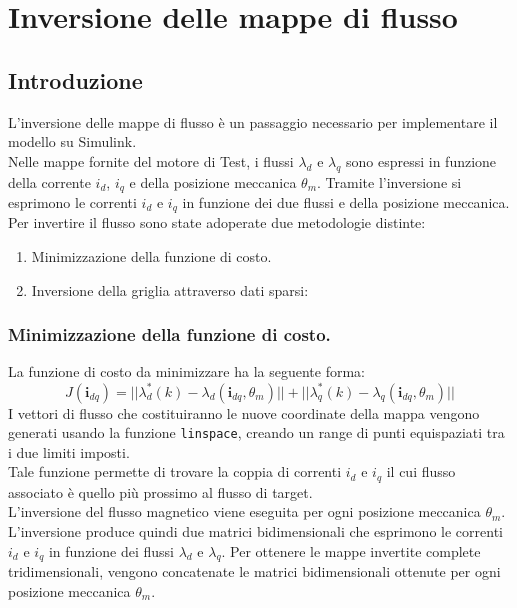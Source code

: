 \chapter{Inversione delle mappe di flusso}
\label{chap:inversione}


 \section{Introduzione}
L'inversione delle mappe di flusso è un passaggio necessario per implementare il modello su Simulink.\\
Nelle mappe fornite del motore di Test, i flussi $\lambda_d$ e $\lambda_q$ sono espressi in funzione della corrente $i_d$, $i_q$ e della posizione meccanica $\theta_m$. Tramite l'inversione si esprimono le correnti $i_d$ e $i_q$ in 
funzione dei due flussi e della posizione meccanica.\\
Per invertire il flusso sono state adoperate due metodologie distinte:
\begin{enumerate}
\item Minimizzazione della funzione di costo.
\item Inversione della griglia attraverso dati sparsi: 

\end{enumerate}
\subsection{Minimizzazione della funzione di costo.}
La funzione di costo da minimizzare ha la seguente forma:
\begin{equation}
    J(\mathbf{i}_{dq}) = || \lambda_d^*(k) - \lambda_d(\mathbf{i}_{dq}, \theta_m) || + || \lambda_q^*(k) - \lambda_q(\mathbf{i}_{dq}, \theta_m) ||
\end{equation}
I vettori di flusso che costituiranno le nuove coordinate della mappa vengono generati usando la funzione \texttt{linspace}, creando un range di punti equispaziati tra i due limiti  imposti.\\
Tale funzione permette di trovare la coppia di correnti  $i_d$ e $i_q$ il cui flusso associato è quello più prossimo al flusso di target.\\
L'inversione del flusso magnetico viene eseguita per ogni posizione meccanica $\theta_m$. L'inversione produce quindi due matrici bidimensionali che esprimono le correnti $i_d$ e $i_q$ in funzione dei flussi $\lambda_d$ e $\lambda_q$. Per ottenere le mappe invertite complete tridimensionali, vengono concatenate le matrici bidimensionali ottenute per ogni posizione meccanica $\theta_m$.\\

